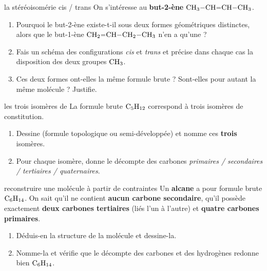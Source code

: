 \documentclass[11pt,a4paper]{article}
\begin{document}
\begin{exo}{la stéréoisomérie cis / trans}
On s'intéresse au \textbf{but-2-ène} $\ce{CH3-CH=CH-CH3}$.
\begin{enumerate}[label=\textbf{\alph*)},leftmargin=2em,itemsep=1pt]
  \item Pourquoi le but-2-ène existe-t-il sous deux formes géométriques distinctes, alors que le but-1-ène $\ce{CH2=CH-CH2-CH3}$ n'en a qu'une ?
  \item Fais un schéma des configurations \emph{cis} et \emph{trans} et précise dans chaque cas la disposition des deux groupes $\ce{CH3}$.
  \item Ces deux formes ont-elles la même formule brute ? Sont-elles pour autant la même molécule ? Justifie.
\end{enumerate}
\end{exo}

\begin{exo}{les trois isomères de }
La formule brute $\ce{C5H12}$ correspond à trois isomères de constitution.
\begin{enumerate}[label=\textbf{\alph*)},leftmargin=2em,itemsep=1pt]
  \item Dessine (formule topologique ou semi-développée) et nomme ces \textbf{trois} isomères.
  \item Pour chaque isomère, donne le décompte des carbones \emph{primaires / secondaires / tertiaires / quaternaires}.
\end{enumerate}
\end{exo}

\begin{exo}{reconstruire une molécule à partir de contraintes}
Un \textbf{alcane} a pour formule brute $\ce{C6H14}$. On sait qu'il ne contient \textbf{aucun carbone secondaire}, qu'il possède exactement \textbf{deux carbones tertiaires} (liés l'un à l'autre) et \textbf{quatre carbones primaires}.
\begin{enumerate}[label=\textbf{\alph*)},leftmargin=2em,itemsep=1pt]
  \item Déduis-en la structure de la molécule et dessine-la.
  \item Nomme-la et vérifie que le décompte des carbones et des hydrogènes redonne bien $\ce{C6H14}$.
\end{enumerate}
\end{exo}
\end{document}
